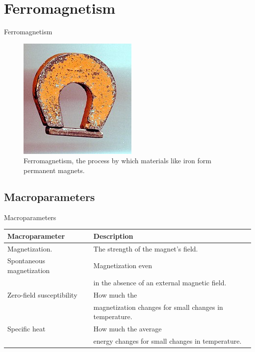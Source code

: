 \documentclass{beamer}
\begin{document}
\section{Ferromagnetism}
\begin{frame}{Ferromagnetism}
  \begin{figure}[ht]
    \centering
    \includegraphics[width=0.5\linewidth]{figures/magnet.jpg}
    \caption{Ferromagnetism, the process by which materials like iron form permanent magnets.\label{fig:label} }
  \end{figure}
\end{frame}


\subsection{Macroparameters}
\begin{frame}{Macroparameters}
  \begin{tabular}{ll}
    \toprule
    Macroparameter & Description\\
    \midrule
    Magnetization. & The strength of the magnet's field.\\
    Spontaneous magnetization & Magnetization even\\
                   &in the absence of an external magnetic field.\\
    Zero-field susceptibility & How much the \\
                   &magnetization changes for small changes in temperature.\\
    Specific heat & How much the average \\
                   &energy changes for small changes in temperature.\\
    \bottomrule
  \end{tabular}
\end{frame}
\end{document}
